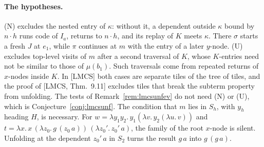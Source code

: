 \documentclass[11pt]{article}
\newcommand{\suc}[2]{#1{\cdot}#2}
\theoremstyle{plain}
\theoremstyle{definition}
\theoremstyle{remark}
\begin{document}
\paragraph{The hypotheses.}  (N) excludes the nested entry of $\kappa$:
without it, a dependent outside $\kappa$ bound by $\suc nh$ runs code of
$I_a$, returns to $\suc nh$, and its replay of $K$ meets $\kappa$.
There $\sigma$ starts a fresh $J$ at $e_1$, while $\pi$ continues at $m$
with the entry of a later $y$-node.  (U) excludes top-level visits of
$m$ after a second traversal of $K$, whose $K$-entries need not be
similar to those of $\mu(b_1)$.  Such traversals come from repeated
returns of $x$-nodes inside $K$.  In [LMCS] both cases are separate
tiles of the tree of tiles, and the proof of [LMCS, Thm.~9.11] excludes
tiles that break the subterm property from unfolding.  The tests of
Remark~\ref{rem:lmcsunfev} do not need (N) or (U), which is
Conjecture~\ref{conj:lmcsunf}.  The condition that $m$ lies in $S_h$,
with $y_h$ heading $H$, is necessary.  For
$w=\lambda y_1y_2.\,y_1(\lambda v.\,y_2(\lambda u.\,v))$ and
$t=\lambda x.\,x\,(\lambda z_0.\,g\,(z_0\,a))\,(\lambda z_0'.\,z_0'\,a)$,
the family of the root $x$-node is silent.  Unfolding at the
dependent $z_0'\,a$ in $S_2$ turns the result $g\,a$ into $g\,(g\,a)$.
\end{document}
